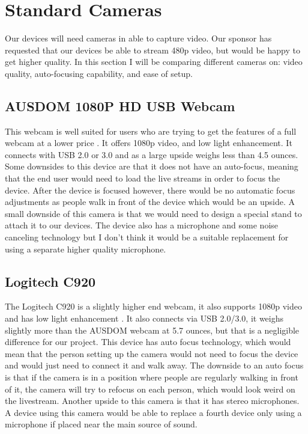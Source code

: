 \documentclass[onecolumn, draftclsnofoot,10pt, compsoc]{IEEEtran}
\begin{document}
\section{Standard Cameras}
Our devices will need cameras in able to capture video. Our sponsor has requested that our devices be able to stream 480p video, but would be happy to get higher quality. In this section I will be comparing different cameras on: video quality, auto-focusing capability, and ease of setup.

    \subsection{AUSDOM 1080P HD USB Webcam}
    This webcam is well suited for users who are trying to get the features of a full webcam at a lower price \cite{IEEEhowto:AUSDOM1080p}. It offers 1080p video, and low light enhancement. It connects with USB 2.0 or 3.0 and as a large upside weighs less than 4.5 ounces. Some downsides to this device are that it does not have an auto-focus, meaning that the end user would need to load the live streams in order to focus the device. After the device is focused however, there would be no automatic focus adjustments as people walk in front of the device which would be an upside. A small downside of this camera is that we would need to design a special stand to attach it to our devices. The device also has a microphone and some noise canceling technology but I don't think it would be a suitable replacement for using a separate higher quality microphone.
    \subsection{Logitech C920}
    The Logitech C920 is a slightly higher end webcam, it also supports 1080p video and has low light enhancement \cite{IEEEhowto:LogitechC920}. It also connects via USB 2.0/3.0, it weighs slightly more than the AUSDOM webcam at 5.7 ounces, but that is a negligible difference for our project. This device has auto focus technology, which would mean that the person setting up the camera would not need to focus the device and would just need to connect it and walk away. The downside to an auto focus is that if the camera is in a position where people are regularly walking in front of it, the camera will try to refocus on each person, which would look weird on the livestream. Another upside to this camera is that it has stereo microphones. A device using this camera would be able to replace a fourth device only using a microphone if placed near the main source of sound.
\end{document}
